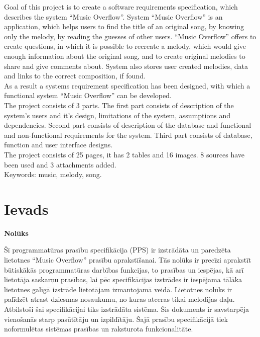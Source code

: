 \documentclass[12pt]{article}
\begin{document}
Goal of this project is to create a software requirements specification, which describes the system ``Music Overflow''. System ``Music Overflow'' is an application, which helps users to find the title of an original song, by knowing only the melody, by reading the guesses of other users. ``Music Overflow'' offers to create questions, in which it is possible to recreate a melody, which would give enough information about the original song, and to create original melodies to share and give comments about. System also stores user created melodies, data and links to the correct composition, if found.\\
\indent As a result a systems requirement specification has been designed, with which a functional system ``Music Overflow'' can be developed.\\
\indent The project consists of 3 parts. The first part consists of description of the system's users and it's design, limitations of the system, assumptions and dependencies. Second part consists of description of the database and functional and non-functional requirements for the system. Third part consists of database, function and user interface designs.\\
\indent The project consists of 25 pages, it has 2 tables and 16 images. 8 sources have been used and 3 attachments added.\\
\indent Keywords: music, melody, song.

\pagebreak

\tableofcontents

\pagebreak

\section*{Ievads}

\textbf{Nolūks}

Šī programmatūras prasību specifikācija (PPS) ir izstrādāta un paredzēta lietotnes ``Music Overflow'' prasību aprakstīšanai.
Tās nolūks ir precīzi aprakstīt būtiskākās programmatūras darbības funkcijas, to prasības un iespējas, kā arī lietotāja saskarņu prasības, lai pēc specifikācijas izstrādes ir iespējama tālāka lietotnes galīgā izstrāde lietotājam izmantojamā veidā.
Lietotnes nolūks ir palīdzēt atrast dziesmas nosaukumu, no kuras atceras tikai melodijas daļu.
Atbilstoši šai specifikācijai tiks izstrādāta sistēma. Šis dokuments ir savstarpēja vienošanās starp pasūtītāju un izpildītāju. Šajā prasību specifikācijā tiek noformulētas sistēmas prasības un raksturota funkcionalitāte.
\end{document}
